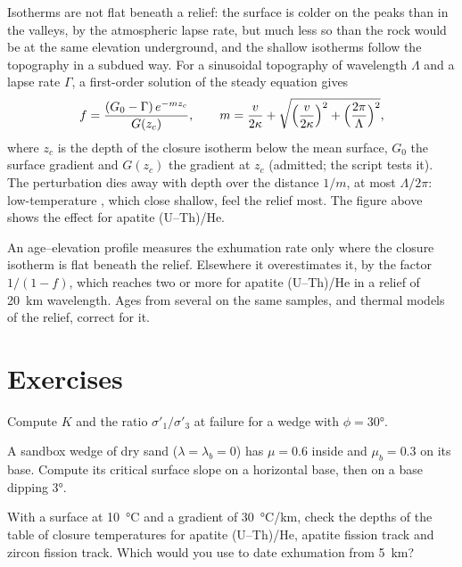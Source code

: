 Isotherms are not flat beneath a relief: the surface is colder on the peaks
than in the valleys, by the atmospheric lapse rate, but much less so than the
rock would be at the same elevation underground, and the shallow isotherms
follow the topography in a subdued way. For a sinusoidal topography of
wavelength $\Lambda$ and a lapse rate $\Gamma$, a first-order solution of the
steady equation gives
\[
  f = \frac{(G_0 - \Gamma)\,e^{-mz_c}}{G(z_c)},\qquad
  m = \frac{v}{2\kappa} + \sqrt{\Bigl(\frac{v}{2\kappa}\Bigr)^2 +
  \Bigl(\frac{2\pi}{\Lambda}\Bigr)^2},
\]
where $z_c$ is the depth of the closure isotherm below the mean surface,
$G_0$ the surface gradient and $G(z_c)$ the gradient at $z_c$ (admitted;
the script tests it). The perturbation dies away with depth over the
distance $1/m$, at most $\Lambda/2\pi$: low-temperature ,
which close shallow, feel the relief most. The figure above shows the effect
for apatite (U--Th)/He.

An age--elevation profile measures the exhumation rate only where the
closure isotherm is flat beneath the relief. Elsewhere it overestimates it, by the factor $1/(1 - f)$, which reaches
two or more for apatite (U--Th)/He in a relief of \qty{20}{km} wavelength.
Ages from several  on the same samples, and thermal models
of the relief, correct for it.

\section{Exercises}

\begin{exercise}[$\star$]\label{exo:b3:orogenic-wedges:1}
Compute $K$ and the ratio $\sigma'_1/\sigma'_3$ at failure for a wedge with
$\phi = \ang{30}$.
\end{exercise}

\begin{exercise}[$\star$]\label{exo:b3:orogenic-wedges:2}
A sandbox wedge of dry sand ($\lambda = \lambda_b = 0$) has $\mu = 0.6$
inside and $\mu_b = 0.3$ on its base. Compute its critical surface slope on a
horizontal base, then on a base dipping \ang{3}.
\end{exercise}

\begin{exercise}[$\star$]\label{exo:b3:orogenic-wedges:3}
With a surface at \qty{10}{\celsius} and a gradient of \qty{30}{\celsius/km},
check the depths of the table of closure temperatures for apatite
(U--Th)/He, apatite fission track and zircon fission track. Which
 would you use to date exhumation from \qty{5}{km}?
\end{exercise}

